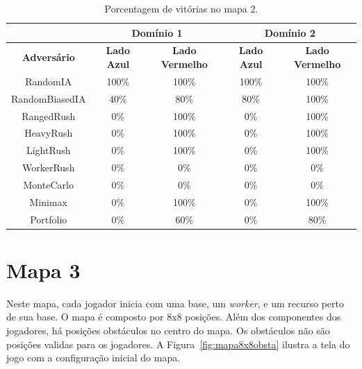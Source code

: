 \begin{table}[ht]
	\centering
	\caption{Porcentagem de vitórias no mapa 2.}
	\label{tab:mapa2}
	\begin{tabular}{|c|cc|cc|}
		\hline
		\textbf{}           & \multicolumn{2}{c|}{\textbf{Domínio 1}}  & \multicolumn{2}{c|}{\textbf{Domínio 2}}  \\ \hline
		\textbf{Adversário} & \textbf{Lado Azul} & \textbf{Lado Vermelho} & \textbf{Lado Azul} & \textbf{Lado Vermelho} \\ \hline
		RandomIA            & 100\%              & 100\%                  & 100\%              & 100\%                  \\ \hline
		RandomBiasedIA      & 40\%               & 80\%                   & 80\%               & 100\%                  \\ \hline
		RangedRush          & 0\%                & 100\%                  & 0\%                & 100\%                  \\ \hline
		HeavyRush           & 0\%                & 100\%                  & 0\%                & 100\%                  \\ \hline
		LightRush           & 0\%                & 100\%                  & 0\%                & 100\%                  \\ \hline
		WorkerRush          & 0\%                & 0\%                    & 0\%                & 0\%                    \\ \hline
		MonteCarlo          & 0\%                & 0\%                    & 0\%                & 0\%                    \\ \hline
		Minimax             & 0\%                & 100\%                  & 0\%                & 100\%                  \\ \hline
		Portfolio           & 0\%                & 60\%                  & 0\%                & 80\%                  \\ \hline
	\end{tabular}
\end{table}


\section{Mapa 3}

Neste mapa, cada jogador inicia com uma base, um \textit{worker}, e um recurso perto de sua base.
O mapa é composto por 8x8 posições.
Além dos componentes dos jogadores, há posições obstáculos no centro do mapa.
Os obstáculos não são posições validas para os jogadores.
A Figura~\ref{fig:mapa8x8obsta} ilustra a tela do jogo com a configuração inicial do mapa.

